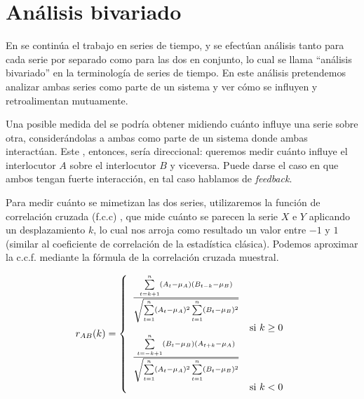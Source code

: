\section{Análisis bivariado}
\label{sec:analisis_bivariado}

\newcommand{\squarederr}[1]{
    \sum\limits_{t=1}^n \varnorm{#1}^2
}

\newcommand{\crosscorr}[2]{
  \frac{\sum\limits_{t=|k|+1}^n \varnorm{#1} (#2_{t-k} - \mu_{#2})}{
    \sqrt{\squarederr{#1} \squarederr{#2}}
  } \\
}

\newcommand{\corrdenom}{\sqrt{\squarederr{A}\squarederr{B}}}

En \cite{KOU2008.2} se continúa el trabajo en series de tiempo, y se efectúan análisis tanto para cada serie por separado como para las dos en conjunto, lo cual se llama ``análisis bivariado'' en la terminología de series de tiempo. En este análisis pretendemos analizar ambas series como parte de un sistema y ver cómo se influyen y retroalimentan mutuamente.

Una posible medida del \entrainment se podría obtener midiendo cuánto influye una serie sobre otra, considerándolas a ambas como parte de un sistema donde ambas interactúan. Este \entrainment, entonces, sería direccional: queremos medir cuánto influye el interlocutor $A$ sobre el interlocutor $B$ y viceversa. Puede darse el caso en que ambos tengan fuerte interacción, en tal caso hablamos de \emph{feedback}.

Para medir cuánto se mimetizan las dos series, utilizaremos la función de correlación cruzada (f.c.c) \cite{CHATFIELD}, que mide cuánto se parecen la serie $X$ e $Y$ aplicando un desplazamiento $k$, lo cual nos arroja como resultado un valor entre $-1$ y $1$ (similar al coeficiente de correlación de la estadística clásica). Podemos aproximar la c.c.f. mediante la fórmula de la correlación cruzada muestral.

\begin{equation}
  \label{cross_correlation_definition}
  r_{AB}(k) =
  \left\{
    \begin{array}{ll}
      \frac{\sum\limits_{t=k+1}^n \varnorm{A} (B_{t-k} - \mu_{B})}{\corrdenom} \\ & \mbox{si } k \geq 0 \\
      \frac{\sum\limits_{t=-k+1}^n \varnorm{B} (A_{t+k} - \mu_{A})}{\corrdenom} \\  & \mbox{si } k < 0
    \end{array}
  \right.
\end{equation}

